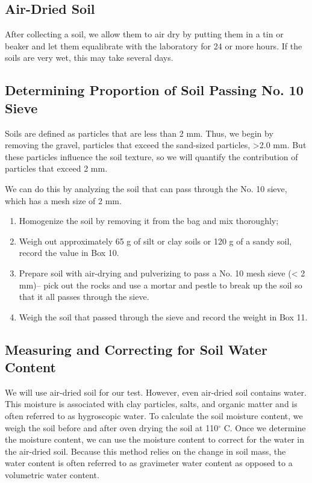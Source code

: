\documentclass{tufte-handout}
\begin{document}
\subsection{Air-Dried Soil}

After collecting a soil, we allow them to air dry by putting them in a tin or beaker and let them equalibrate with the laboratory for 24 or more hours. If the soils are very wet, this may take several days. 

\subsection{Determining Proportion of Soil Passing No. 10 Sieve}

Soils are defined as particles that are less than 2 mm. Thus, we begin by removing the gravel, particles that exceed the sand-sized particles, >2.0 mm. But these particles influence the soil texture, so we will quantify the contribution of particles that exceed 2 mm. 

We can do this by analyzing the soil that can pass through the No. 10 sieve, which has a mesh size of 2 mm.  

\begin{enumerate}
	\item Homogenize the soil by removing it from the bag and mix thoroughly;
	\item Weigh out approximately 65 g of silt or clay soils or 120 g of a sandy soil, record the value in Box 10. 
	\item Prepare soil with air-drying and pulverizing to pass a No. 10 mesh sieve (< 2 mm)-- pick out the rocks and use a mortar and pestle to break up the soil so that it all passes through the sieve. 
	\item Weigh the soil that passed through the sieve and record the weight in Box 11.
\end{enumerate}
  
\subsection{Measuring and Correcting for Soil Water Content}

We will use air-dried soil for our test. However, even air-dried soil contains water. This moisture is associated with clay particles, salts, and organic matter and is often referred to as hygroscopic water. To calculate the soil moisture content, we weigh the soil before and after oven drying the soil at 110$^\circ$ C. Once we determine the moisture content, we can use the moisture content to correct for the water in the air-dried soil. Because this method relies on the change in soil mass, the water content is often referred to as gravimeter water content as opposed to a volumetric water content.
\end{document}

